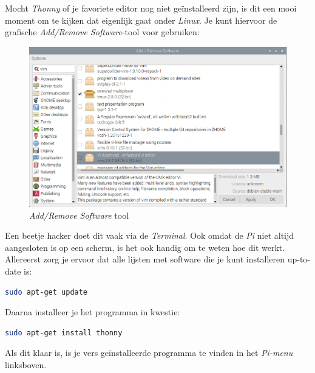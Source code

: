 Mocht \textit{Thonny} of je favoriete editor nog niet geïnstalleerd zijn, is dit een mooi moment om te kijken dat eigenlijk gaat onder \textit{Linux}. Je kunt hiervoor de grafische \textit{Add/Remove Software}-tool voor gebruiken:
\begin{figure}[h!]
\centering\includegraphics[scale=0.25]{Pictures/chapter05/add_remove_software.png}
\caption{\textit{Add/Remove Software} tool}
\label{fig:addremovesoftware} %
\end{figure}

\begin{remark}
Een beetje hacker doet dit vaak via de \textit{Terminal}. Ook omdat de \textit{Pi} niet altijd aangesloten is op een scherm, is het ook handig om te weten hoe dit werkt. Allereerst zorg je ervoor dat alle lijsten met software die je kunt installeren up-to-date is:
\begin{lstlisting}[language=bash]
sudo apt-get update
\end{lstlisting}

Daarna installeer je het programma in kwestie:
\begin{lstlisting}[language=bash]
sudo apt-get install thonny
\end{lstlisting}
Als dit klaar is, is je vers geïnstalleerde programma te vinden in het \textit{Pi-menu} linksboven.
\end{remark}

\newpage 

